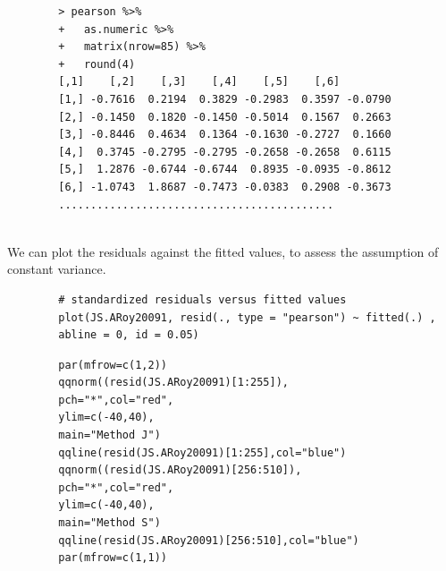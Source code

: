 \documentclass[12pt, a4paper]{report}
\theoremstyle{plain}
\theoremstyle{definition}
\theoremstyle{remark}
\begin{document}
	
	\begin{framed}
		\begin{verbatim}
		> pearson %>%
		+   as.numeric %>% 
		+   matrix(nrow=85) %>%
		+   round(4) 
		[,1]    [,2]    [,3]    [,4]    [,5]    [,6]
		[1,] -0.7616  0.2194  0.3829 -0.2983  0.3597 -0.0790
		[2,] -0.1450  0.1820 -0.1450 -0.5014  0.1567  0.2663
		[3,] -0.8446  0.4634  0.1364 -0.1630 -0.2727  0.1660
		[4,]  0.3745 -0.2795 -0.2795 -0.2658 -0.2658  0.6115
		[5,]  1.2876 -0.6744 -0.6744  0.8935 -0.0935 -0.8612
		[6,] -1.0743  1.8687 -0.7473 -0.0383  0.2908 -0.3673
		...........................................
		
		\end{verbatim}
	\end{framed}
	
	We can plot the residuals against the fitted values, to assess the assumption of constant variance. 
	\begin{framed}
		\begin{verbatim}
		# standardized residuals versus fitted values 
		plot(JS.ARoy20091, resid(., type = "pearson") ~ fitted(.) , 
		abline = 0, id = 0.05)
		\end{verbatim}
	\end{framed}
	
	
	\begin{framed}
		\begin{verbatim}
		par(mfrow=c(1,2))
		qqnorm((resid(JS.ARoy20091)[1:255]),
		pch="*",col="red",
		ylim=c(-40,40),
		main="Method J")
		qqline(resid(JS.ARoy20091)[1:255],col="blue")
		qqnorm((resid(JS.ARoy20091)[256:510]),
		pch="*",col="red",
		ylim=c(-40,40),
		main="Method S")
		qqline(resid(JS.ARoy20091)[256:510],col="blue")
		par(mfrow=c(1,1))
		\end{verbatim}	
	\end{framed}
	
\end{document}
